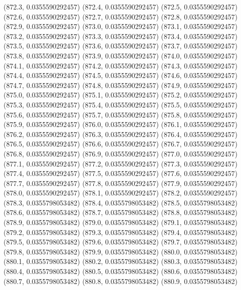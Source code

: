 {					(872.3, 0.0355590292457)
					(872.4, 0.0355590292457)
					(872.5, 0.0355590292457)
					(872.6, 0.0355590292457)
					(872.7, 0.0355590292457)
					(872.8, 0.0355590292457)
					(872.9, 0.0355590292457)
					(873.0, 0.0355590292457)
					(873.1, 0.0355590292457)
					(873.2, 0.0355590292457)
					(873.3, 0.0355590292457)
					(873.4, 0.0355590292457)
					(873.5, 0.0355590292457)
					(873.6, 0.0355590292457)
					(873.7, 0.0355590292457)
					(873.8, 0.0355590292457)
					(873.9, 0.0355590292457)
					(874.0, 0.0355590292457)
					(874.1, 0.0355590292457)
					(874.2, 0.0355590292457)
					(874.3, 0.0355590292457)
					(874.4, 0.0355590292457)
					(874.5, 0.0355590292457)
					(874.6, 0.0355590292457)
					(874.7, 0.0355590292457)
					(874.8, 0.0355590292457)
					(874.9, 0.0355590292457)
					(875.0, 0.0355590292457)
					(875.1, 0.0355590292457)
					(875.2, 0.0355590292457)
					(875.3, 0.0355590292457)
					(875.4, 0.0355590292457)
					(875.5, 0.0355590292457)
					(875.6, 0.0355590292457)
					(875.7, 0.0355590292457)
					(875.8, 0.0355590292457)
					(875.9, 0.0355590292457)
					(876.0, 0.0355590292457)
					(876.1, 0.0355590292457)
					(876.2, 0.0355590292457)
					(876.3, 0.0355590292457)
					(876.4, 0.0355590292457)
					(876.5, 0.0355590292457)
					(876.6, 0.0355590292457)
					(876.7, 0.0355590292457)
					(876.8, 0.0355590292457)
					(876.9, 0.0355590292457)
					(877.0, 0.0355590292457)
					(877.1, 0.0355590292457)
					(877.2, 0.0355590292457)
					(877.3, 0.0355590292457)
					(877.4, 0.0355590292457)
					(877.5, 0.0355590292457)
					(877.6, 0.0355590292457)
					(877.7, 0.0355590292457)
					(877.8, 0.0355590292457)
					(877.9, 0.0355590292457)
					(878.0, 0.0355590292457)
					(878.1, 0.0355590292457)
					(878.2, 0.0355590292457)
					(878.3, 0.0355798053482)
					(878.4, 0.0355798053482)
					(878.5, 0.0355798053482)
					(878.6, 0.0355798053482)
					(878.7, 0.0355798053482)
					(878.8, 0.0355798053482)
					(878.9, 0.0355798053482)
					(879.0, 0.0355798053482)
					(879.1, 0.0355798053482)
					(879.2, 0.0355798053482)
					(879.3, 0.0355798053482)
					(879.4, 0.0355798053482)
					(879.5, 0.0355798053482)
					(879.6, 0.0355798053482)
					(879.7, 0.0355798053482)
					(879.8, 0.0355798053482)
					(879.9, 0.0355798053482)
					(880.0, 0.0355798053482)
					(880.1, 0.0355798053482)
					(880.2, 0.0355798053482)
					(880.3, 0.0355798053482)
					(880.4, 0.0355798053482)
					(880.5, 0.0355798053482)
					(880.6, 0.0355798053482)
					(880.7, 0.0355798053482)
					(880.8, 0.0355798053482)
					(880.9, 0.0355798053482)
}

